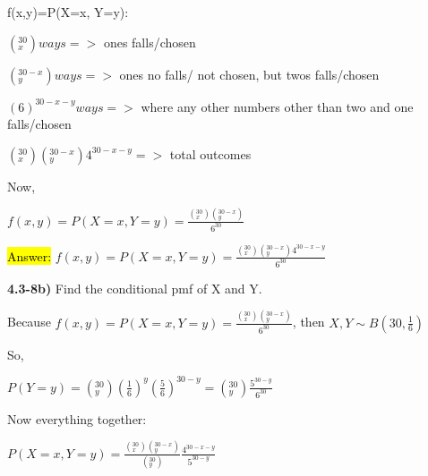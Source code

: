 \documentclass{article}
\begin{document}
f(x,y)=P(X=x, Y=y):

\vspace{2mm}

$(^{30}_{x}) ways =>$ ones falls/chosen  

\vspace{2mm}

$(^{30-x}_{y}) ways =>$ ones no falls/ not chosen, but twos falls/chosen  

\vspace{2mm}

$(6)^{30-x-y} ways =>$ where any other numbers other than two and one falls/chosen

\vspace{2mm}

$(^{30}_{x})(^{30-x}_{y})4^{30-x-y} =>$ total outcomes

\vspace{2mm}

Now,

\vspace{2mm}

$f(x,y)=P(X=x, Y=y)=\frac{(^{30}_{x})(^{30-x}_{y}) }{6^{30}}$

\vspace{2mm}



\hl{Answer:} $f(x,y)=P(X=x, Y=y)=\frac{(^{30}_{x})(^{30-x}_{y}) 4^{30-x-y} }{6^{30}}$

\vspace{5mm}


\textbf{4.3-8b)} Find the conditional pmf of X and Y.

\vspace{2mm}

Because $f(x,y)=P(X=x, Y=y)=\frac{(^{30}_{x})(^{30-x}_{y}) }{6^{30}}$, then $X,Y \sim B(30, \frac{1}{6})$

\vspace{2mm}

So,

\vspace{2mm}

$P(Y=y)=(^{30}_{y})(\frac{1}{6})^{y}(\frac{5}{6})^{30-y}=(^{30}_{y})\frac{5^{30-y}}{6^{30}}$

\vspace{4mm}

Now everything together:

\vspace{2mm}

$P(X=x, Y=y)=\frac{(^{30}_{x})(^{30-x}_{y})}{(^{30}_{y})} \frac{4^{30-x-y} }{5^{30-y}}$
\end{document}
